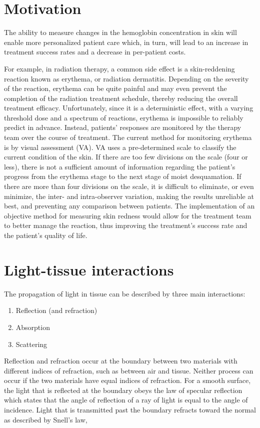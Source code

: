 \section{Motivation}
The ability to measure changes in the hemoglobin concentration in skin will enable more personalized patient care which, in turn, will lead to an increase in treatment success rates and a decrease in per-patient costs.

For example, in radiation therapy, a common side effect is a skin-reddening reaction known as erythema, or radiation dermatitis.\cite{McQuestion2006} Depending on the severity of the reaction, erythema can be quite painful and may even prevent the completion of the radiation treatment schedule, thereby reducing the overall treatment efficacy. Unfortunately, since it is a deterministic effect,\cite{Hall2000} with a varying threshold dose and a spectrum of reactions, erythema is impossible to reliably predict in advance. Instead, patients’ responses are monitored by the therapy team over the course of treatment. The current method for monitoring erythema is by visual assessment (VA). VA uses a pre-determined scale to classify the current condition of the skin. If there are too few divisions on the scale (four or less), there is not a sufficient amount of information regarding the patient’s progress from the erythema stage to the next stage of moist desquamation. If there are more than four divisions on the scale, it is difficult to eliminate, or even minimize, the inter- and intra-observer variation, making the results unreliable at best, and preventing any comparison between patients. The implementation of an objective method for measuring skin redness would allow for the treatment team to better manage the reaction, thus improving the treatment’s success rate and the patient’s quality of life.

\section{Light-tissue interactions}
The propagation of light in tissue can be described by three main interactions:\cite{Niemz2007}
\begin{enumerate}
	\item Reflection (and refraction)
	\item Absorption
	\item Scattering
\end{enumerate}

Reflection and refraction occur at the boundary between two materials with different indices of refraction, such as between air and tissue. Neither process can occur if the two materials have equal indices of refraction. For a smooth surface, the light that is reflected at the boundary obeys the law of specular reflection which states that the angle of reflection of a ray of light is equal to the angle of incidence.\cite{Knight2013} Light that is transmitted past the boundary refracts toward the normal as described by Snell's law,

